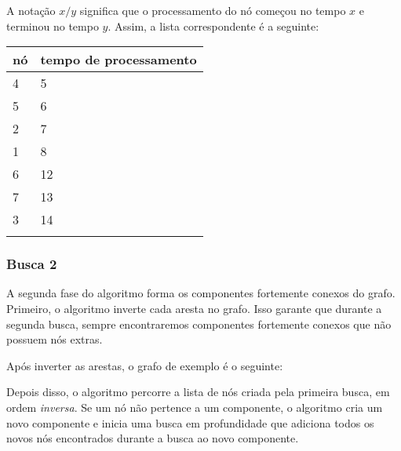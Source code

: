 A notação $x/y$ significa que
o processamento do nó começou
no tempo $x$ e terminou no tempo $y$.
Assim, a lista correspondente é a seguinte:

\begin{tabular}{ll}
\\
nó & tempo de processamento \\
\hline
4 & 5 \\
5 & 6 \\
2 & 7 \\
1 & 8 \\
6 & 12 \\
7 & 13 \\
3 & 14 \\
\\
\end{tabular}
% 

\subsubsection{Busca 2}

A segunda fase do algoritmo
forma os componentes fortemente conexos
do grafo.
Primeiro, o algoritmo inverte cada
aresta no grafo.
Isso garante que durante a segunda busca,
sempre encontraremos componentes fortemente conexos
que não possuem nós extras.

Após inverter as arestas,
o grafo de exemplo é o seguinte:
\begin{center}
\end{center}

Depois disso, o algoritmo percorre
a lista de nós criada pela primeira busca,
em ordem \emph{inversa}.
Se um nó não pertence a um componente,
o algoritmo cria um novo componente
e inicia uma busca em profundidade
que adiciona todos os novos nós encontrados durante a busca
ao novo componente.

